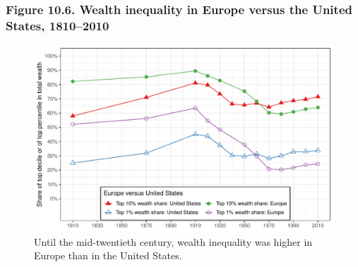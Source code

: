\documentclass[t]{beamer}\usepackage[]{graphicx}\usepackage[]{color}
\newenvironment{knitrout}{}{} %
\begin{document}
\begin{frame}[label=Figure_10_6]
\frametitle{Figure 10.6. Wealth inequality in Europe versus the United States, 1810--2010}
\begin{figure}[t]
\begin{minipage}[b]{\textwidth}
\centering
\begin{knitrout}\footnotesize
{}\color{fgcolor}

{\centering \includegraphics[width=1\linewidth]{figures/color/Figure_10_6} 

}



\end{knitrout}
\caption{Until the mid-twentieth century, wealth inequality was higher in Europe than in the United States.}
\end{minipage}
\end{figure}
\end{frame}
\end{document}
